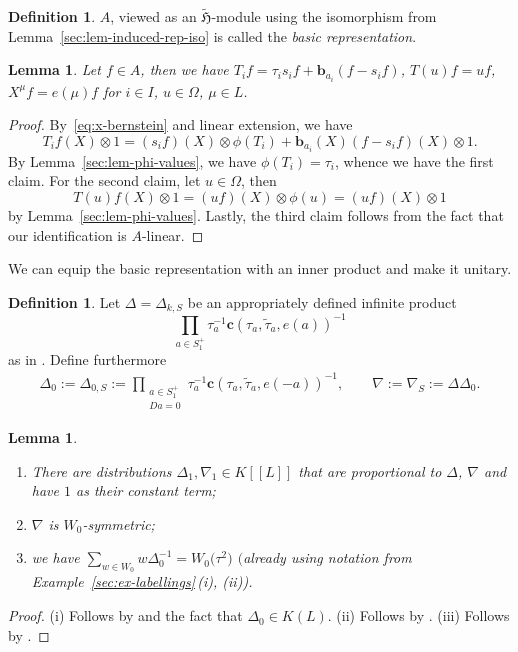 \documentclass[pdftex]{sigma}
\newtheorem{Lemma}[Theorem]{Lemma}
\theoremstyle{definition}
\newtheorem{Definition}[Theorem]{Definition}
\numberwithin{equation}{section}
\begin{document}
\begin{Definition}
 $A$, viewed as an $\tilde{\mathfrak{H}}$-module using the isomorphism from
 Lemma~\ref{sec:lem-induced-rep-iso} is called the \emph{basic representation}.
\end{Definition}

\begin{Lemma}\label{sec:lem-concrete-basic-rep}
 Let $f\in A$, then we have
$
 T_i f = \tau_i s_i f + \bm{b}_{a_i} (f - s_i f)$, $
 T(u) f = uf$, $
 X^\mu f = e(\mu)f
$
 for $i\in I$, $u\in\Omega$, $\mu\in L$.
\end{Lemma}
\begin{proof}
 By~\eqref{eq:x-bernstein} and linear extension, we have
 \[
 T_i f(X)\otimes 1 = (s_if)(X)\otimes \phi(T_i) + \bm{b}_{a_i}(X)(f-s_if)(X)\otimes 1.
 \]
 By Lemma~\ref{sec:lem-phi-values}, we have $\phi(T_i)=\tau_i$, whence
 we have the first claim. For the second claim, let $u\in \Omega$, then
 \[
 T(u)f(X)\otimes 1 = (uf)(X)\otimes\phi(u)
 = (uf)(X)\otimes 1
 \]
 by Lemma~\ref{sec:lem-phi-values}. Lastly, the third claim follows from the fact that our identification
 is $A$-linear.
\end{proof}

We can equip the basic representation with an inner product and make it
unitary.

\begin{Definition}\label{sec:def-deltas-nabla}
 Let $\Delta=\Delta_{k,S}$ be
 an appropriately defined infinite product
 \[
 \prod_{a\in S_1^+} \tau_a^{-1}\bm{c}(\tau_a,\tilde{\tau}_a, e(a))^{-1}
 \]
 as in \cite[Section~5.1.7\,ff]{macdonald}.
 Define furthermore
 \begin{align*}
 \Delta_0:= \Delta_{0,S}:= \prod_{\substack{a\in S_1^+\\Da=0}}
 \tau_a^{-1}\bm{c}(\tau_a,\tilde{\tau}_a,e(-a))^{-1},\qquad
 \nabla:= \nabla_S :=
 \Delta\Delta_0.
 \end{align*}
\end{Definition}

\begin{Lemma}\label{lem-weight-distributions}\quad
 \begin{enumerate}\itemsep=0pt
 \item[$(i)$] There are distributions $\Delta_1,\nabla_1\in K[[L]]$ that are proportional to
 $\Delta$, $\nabla$ and have $1$ as their constant term;
 \item[$(ii)$] $\nabla$ is $W_0$-symmetric;
 \item[$(iii)$] we have
$
 \sum_{w\in W_0} w\Delta_0^{-1} = W_0\bigl(\tau^2\bigr)
$
$($already using notation from Example~{\rm \ref{sec:ex-labellings}\,(i), (ii))}.
 \end{enumerate}
\end{Lemma}
\begin{proof}
(i) Follows by \cite[Section~5.1.10]{macdonald}
 and the fact that $\Delta_0\in K(L)$.
(ii) Follows by \cite[Section~5.1.27]{macdonald}.
(iii) Follows by \cite[Section~5.1.36]{macdonald}.
\end{proof}
\end{document}
